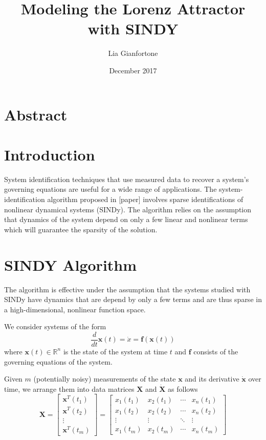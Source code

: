 \documentclass[12pt,preprintnumbers,amsmath,amssymb,titlepage]{report}
\begin{document}
\title{Modeling the Lorenz Attractor with SINDY}
\author{Lia Gianfortone}
\date{December 2017}

\maketitle


\section*{Abstract}

\section*{Introduction}

System identification techniques that use measured data to recover a system's governing equations are useful for a wide range of applications. The system-identification algorithm proposed in [paper] involves sparse identifications of nonlinear dynamical systems (SINDy). The algorithm relies on the assumption that dynamics of the system depend on only a few linear and nonlinear terms which will guarantee the sparsity of the solution. 


\section*{SINDY Algorithm}
The algorithm is effective under the assumption that the systems studied with SINDy have dynamics that are depend by only a few terms and are thus sparse in a high-dimensional, nonlinear function space. 

We consider systems of the form 
\begin{equation}
\frac{d}{dt}\bm{x}(t) = \dot{x} = \bm{f}(\bm{x}(t))
\end{equation}
where $\bm{x}(t) \in \mathbb{R}^n$ is the state of the system at time $t$ and $\bm{f}$ consists of the governing equations of the system. 

Given $m$ (potentially noisy) measurements of the state $\bm{x}$ and its derivative $\bm{\dot{x}}$ over time, we arrange them into data matrices $\bm{X}$ and $\bm{\dot{X}}$ as follows
\begin{equation*}
	\bm{X} = \begin{bmatrix} 
				\bm{x}^T(t_1) \\ \bm{x}^T(t_2) \\ \vdots \\ \bm{x}^T(t_m)
			\end{bmatrix}
		   = \begin{bmatrix}
		   		x_1(t_1) & x_2(t_1) & \cdots & x_n(t_1) \\
		   		x_1(t_2) & x_2(t_2) & \cdots & x_n(t_2) \\
		   		\vdots   & \vdots   & \ddots & \vdots   \\
		   		x_1(t_m) & x_2(t_m) & \cdots & x_n(t_m) 
	   		\end{bmatrix}
\end{equation*}
\end{document}
